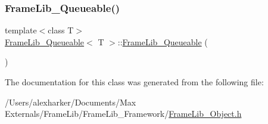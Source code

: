 \subsubsection{\texorpdfstring{Frame\+Lib\+\_\+\+Queueable()}{FrameLib\_Queueable()}}
{\footnotesize\ttfamily template$<$class T$>$ \\
\hyperlink{class_frame_lib___queueable}{Frame\+Lib\+\_\+\+Queueable}$<$ T $>$\+::\hyperlink{class_frame_lib___queueable}{Frame\+Lib\+\_\+\+Queueable} (\begin{DoxyParamCaption}{ }\end{DoxyParamCaption})\hspace{0.3cm}{\ttfamily [inline]}}



The documentation for this class was generated from the following file\+:\begin{DoxyCompactItemize}
\item 
/\+Users/alexharker/\+Documents/\+Max Externals/\+Frame\+Lib/\+Frame\+Lib\+\_\+\+Framework/\hyperlink{_frame_lib___object_8h}{Frame\+Lib\+\_\+\+Object.\+h}\end{DoxyCompactItemize}
